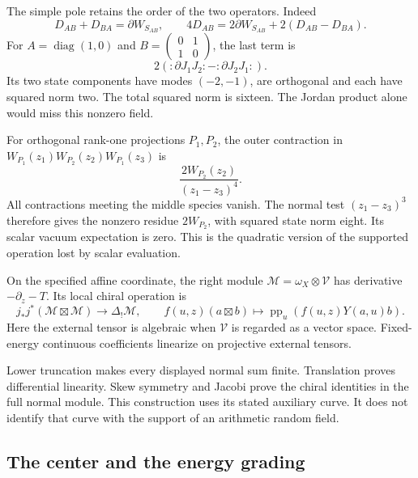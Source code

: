 The simple pole retains the order of the two
operators. Indeed
\[
 D_{AB}+D_{BA}=\partial W_{S_{AB}},\qquad
 4D_{AB}=2\partial W_{S_{AB}}+2(D_{AB}-D_{BA}).
\]
For \(A=\operatorname{diag}(1,0)\) and
\(B=\left(\begin{smallmatrix}0&1\\1&0\end{smallmatrix}\right)\),
the last term is
\[
                  2(:\partial J_1J_2:-:\partial J_2J_1:).
\]
Its two state components have modes \((-2,-1)\),
are orthogonal and each have squared norm two.
The total squared norm is sixteen. The Jordan
product alone would miss this nonzero field.

For orthogonal rank-one projections \(P_1,P_2\),
the outer contraction in
\(W_{P_1}(z_1)W_{P_2}(z_2)W_{P_1}(z_3)\) is
\begin{equation}\label{v4-eq:singular-quadratic-outer}
                   \frac{2W_{P_2}(z_2)}{(z_1-z_3)^4}.
\end{equation}
All contractions meeting the middle species vanish.
The normal test \((z_1-z_3)^3\) therefore gives
the nonzero residue \(2W_{P_2}\), with squared
state norm eight. Its scalar vacuum expectation
is zero. This is the quadratic version of the
supported operation lost by scalar evaluation.

On the specified affine coordinate, the right
module \(\mathcal M=\omega_X\otimes\mathcal V\)
has derivative \(-\partial_z-T\). Its local
chiral operation is
\begin{equation}\label{v4-eq:singular-hilbert-chiral}
 j_*j^*(\mathcal M\boxtimes\mathcal M)
      \longrightarrow\Delta_!\mathcal M,
 \qquad f(u,z)(a\boxtimes b)
      \longmapsto\operatorname{pp}_u(f(u,z)Y(a,u)b).
\end{equation}
Here the external tensor is algebraic when
\(\mathcal V\) is regarded as a vector space.
Fixed-energy continuous coefficients linearize
on projective external tensors.

Lower truncation makes every displayed normal
sum finite. Translation proves differential
linearity. Skew symmetry and Jacobi prove the
chiral identities in the full normal module.
This construction uses its stated auxiliary
curve. It does not identify that curve with
the support of an arithmetic random field.

\subsection{The center and the energy grading}

